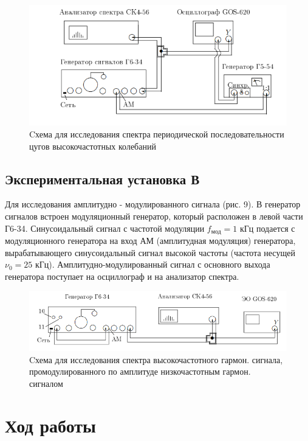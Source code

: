	
		
		\begin{figure}[h]
			\centering
			\includegraphics[width=0.8\linewidth]{pics/sp8.png}
			\caption{Cхема для исследования спектра периодической последовательности цугов высокочастотных колебаний}
			\label{B}
		\end{figure}
		
\newpage
\newline
		
\subsection{Экспериментальная установка В}
		Для исследования амплитудно - модулированного сигнала (рис. 9). В генератор сигналов встроен модуляционный генератор, который расположен в левой части Г6-34. Синусоидальный сигнал с частотой модуляции $f_{мод}=1$ кГц подается с модуляционного генератора на вход АМ (амплитудная модуляция) генератора, вырабатывающего синусоидальный сигнал высокой частоты (частота несущей $\nu_{0}=25$ кГц). Амплитудно-модулированный сигнал с основного выхода генератора поступает на осциллограф и на анализатор спектра. 
		
		\begin{figure}[h]
			\centering
			\includegraphics[width=0.8\linewidth]{pics/sp9.png}
			\caption{Cхема для исследования спектра высокочастотного гармон. сигнала, промодулированного по амплитуде низкочастотным гармон. сигналом}
			\label{C}
		\end{figure}
		
		
		\newpage
\newline

	\section{Ход работы}
  	
